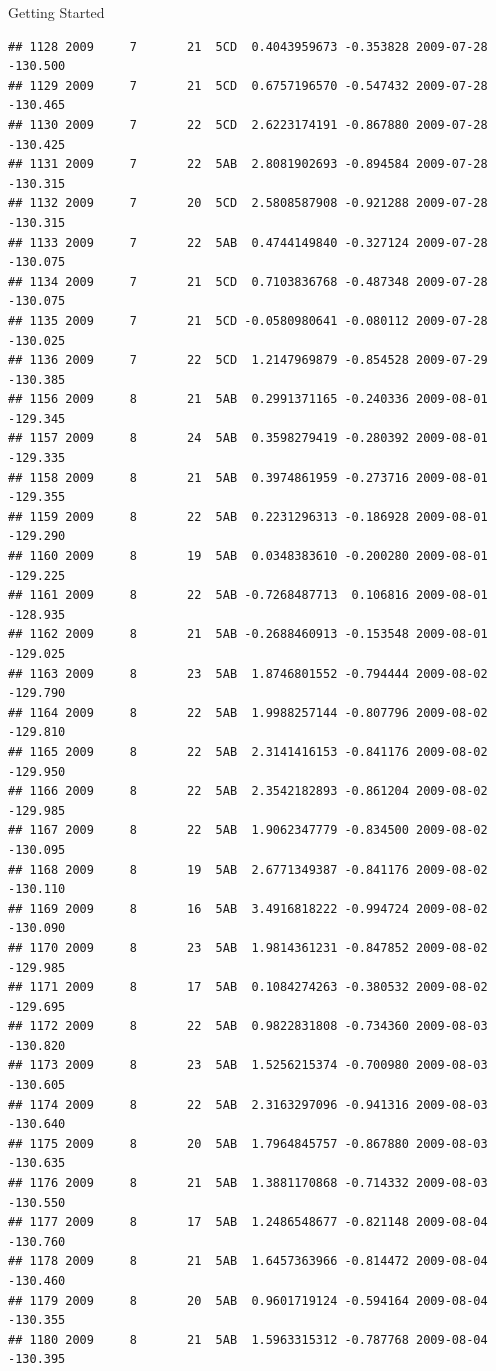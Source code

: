 \documentclass[
  ignorenonframetext,
]{beamer}
\begin{document}
\begin{frame}[fragile]{Getting Started}
\begin{verbatim}
## 1128 2009     7       21  5CD  0.4043959673 -0.353828 2009-07-28 -130.500
## 1129 2009     7       21  5CD  0.6757196570 -0.547432 2009-07-28 -130.465
## 1130 2009     7       22  5CD  2.6223174191 -0.867880 2009-07-28 -130.425
## 1131 2009     7       22  5AB  2.8081902693 -0.894584 2009-07-28 -130.315
## 1132 2009     7       20  5CD  2.5808587908 -0.921288 2009-07-28 -130.315
## 1133 2009     7       22  5AB  0.4744149840 -0.327124 2009-07-28 -130.075
## 1134 2009     7       21  5CD  0.7103836768 -0.487348 2009-07-28 -130.075
## 1135 2009     7       21  5CD -0.0580980641 -0.080112 2009-07-28 -130.025
## 1136 2009     7       22  5CD  1.2147969879 -0.854528 2009-07-29 -130.385
## 1156 2009     8       21  5AB  0.2991371165 -0.240336 2009-08-01 -129.345
## 1157 2009     8       24  5AB  0.3598279419 -0.280392 2009-08-01 -129.335
## 1158 2009     8       21  5AB  0.3974861959 -0.273716 2009-08-01 -129.355
## 1159 2009     8       22  5AB  0.2231296313 -0.186928 2009-08-01 -129.290
## 1160 2009     8       19  5AB  0.0348383610 -0.200280 2009-08-01 -129.225
## 1161 2009     8       22  5AB -0.7268487713  0.106816 2009-08-01 -128.935
## 1162 2009     8       21  5AB -0.2688460913 -0.153548 2009-08-01 -129.025
## 1163 2009     8       23  5AB  1.8746801552 -0.794444 2009-08-02 -129.790
## 1164 2009     8       22  5AB  1.9988257144 -0.807796 2009-08-02 -129.810
## 1165 2009     8       22  5AB  2.3141416153 -0.841176 2009-08-02 -129.950
## 1166 2009     8       22  5AB  2.3542182893 -0.861204 2009-08-02 -129.985
## 1167 2009     8       22  5AB  1.9062347779 -0.834500 2009-08-02 -130.095
## 1168 2009     8       19  5AB  2.6771349387 -0.841176 2009-08-02 -130.110
## 1169 2009     8       16  5AB  3.4916818222 -0.994724 2009-08-02 -130.090
## 1170 2009     8       23  5AB  1.9814361231 -0.847852 2009-08-02 -129.985
## 1171 2009     8       17  5AB  0.1084274263 -0.380532 2009-08-02 -129.695
## 1172 2009     8       22  5AB  0.9822831808 -0.734360 2009-08-03 -130.820
## 1173 2009     8       23  5AB  1.5256215374 -0.700980 2009-08-03 -130.605
## 1174 2009     8       22  5AB  2.3163297096 -0.941316 2009-08-03 -130.640
## 1175 2009     8       20  5AB  1.7964845757 -0.867880 2009-08-03 -130.635
## 1176 2009     8       21  5AB  1.3881170868 -0.714332 2009-08-03 -130.550
## 1177 2009     8       17  5AB  1.2486548677 -0.821148 2009-08-04 -130.760
## 1178 2009     8       21  5AB  1.6457363966 -0.814472 2009-08-04 -130.460
## 1179 2009     8       20  5AB  0.9601719124 -0.594164 2009-08-04 -130.355
## 1180 2009     8       21  5AB  1.5963315312 -0.787768 2009-08-04 -130.395

\end{verbatim}
\end{frame}
\end{document}
